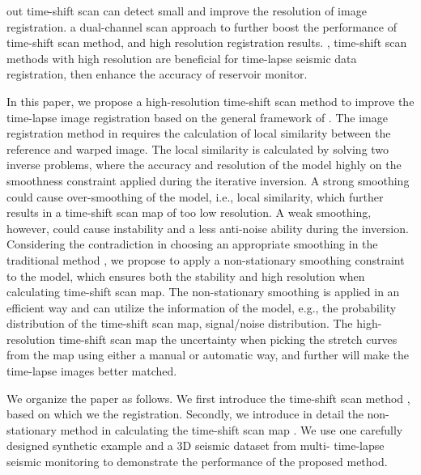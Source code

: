 \cite{zhang2014scan}  out time-shift scan can detect small  and improve the resolution of image registration.
\cite{decastro2016rapid}  a dual-channel scan approach to further  boost the performance of  time-shift scan method, and  high resolution registration results.
, time-shift scan methods with high resolution are beneficial for time-lapse seismic data registration, then enhance the accuracy of reservoir monitor.

In this paper, we propose a high-resolution time-shift scan method to improve the time-lapse image registration based on the general framework of \cite{fomel20094}. The image registration method in \cite{fomel20094} requires the calculation of local similarity between the reference and warped image. The local similarity is calculated by solving two inverse problems, where the accuracy and resolution of the model highly  on the smoothness constraint applied during the iterative inversion. A strong smoothing could cause over-smoothing of the model, i.e., local similarity, which further results in a time-shift scan map of too low resolution. A weak smoothing, however, could cause instability and a less anti-noise ability during the inversion. Considering the contradiction in choosing an appropriate smoothing in the traditional method \cite[]{fomel20094}, we propose to apply a non-stationary smoothing constraint to the model, which ensures both the stability and high resolution when calculating  time-shift scan map. The non-stationary smoothing is applied in an efficient way and can utilize the  information of the model, e.g., the probability distribution of the time-shift scan map,  signal/noise distribution. The high-resolution time-shift scan map   the uncertainty when picking the stretch curves from the map using either a manual or automatic way, and further will make the time-lapse images better matched. 

We organize the paper as follows. We first introduce the time-shift scan method , based on which we  the registration. Secondly, we introduce in detail the non-stationary method in calculating the time-shift scan map . We use one carefully designed synthetic example and a 3D seismic dataset from multi- time-lapse seismic monitoring to demonstrate the performance of the proposed method. 

